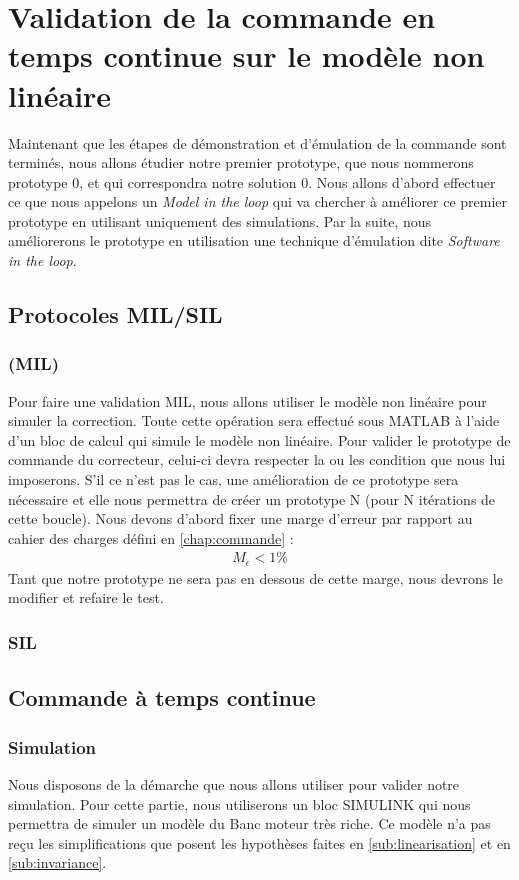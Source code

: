 \chapter{Validation de la commande en temps continue sur le modèle non linéaire}\label{ValidationCommande}
Maintenant que les étapes de démonstration et d'émulation de la commande sont terminés, nous allons étudier notre premier prototype, que nous nommerons prototype 0, et qui correspondra  notre solution 0. Nous allons d'abord effectuer ce que nous appelons un \emph{Model in the loop} qui va chercher à améliorer ce premier prototype en utilisant uniquement des simulations. Par la suite, nous améliorerons le prototype en utilisation une technique d'émulation dite \emph{Software in the loop}.
\section{Protocoles MIL/SIL}
	\subsection{(MIL)}
	Pour faire une validation MIL, nous allons utiliser le modèle non linéaire pour simuler la correction. Toute cette opération sera effectué sous MATLAB à l'aide d'un bloc de calcul qui simule le modèle non linéaire. Pour valider le prototype de commande du correcteur, celui-ci devra respecter la ou les condition que nous lui imposerons. S'il ce n'est pas le cas, une amélioration de ce prototype sera nécessaire et elle nous permettra de créer un prototype N (pour N itérations de cette boucle). 
	Nous devons d'abord fixer une marge d'erreur par rapport au cahier des charges défini en \ref{chap:commande} : 
	\begin{align}\label{eqn_margeErreur}
		M_\epsilon < 1\%
	\end{align}
	Tant que notre prototype ne sera pas en dessous de cette marge, nous devrons le modifier et refaire le test.
	\subsection{SIL}
\section{Commande à temps continue}
	\subsection{Simulation}
		Nous disposons de la démarche que nous allons utiliser pour valider notre simulation. Pour cette partie, nous utiliserons un bloc SIMULINK qui nous permettra de simuler un modèle du Banc moteur très riche. Ce modèle n'a pas reçu les simplifications que posent les hypothèses faites en \ref{sub:linearisation} et en \ref{sub:invariance}.
